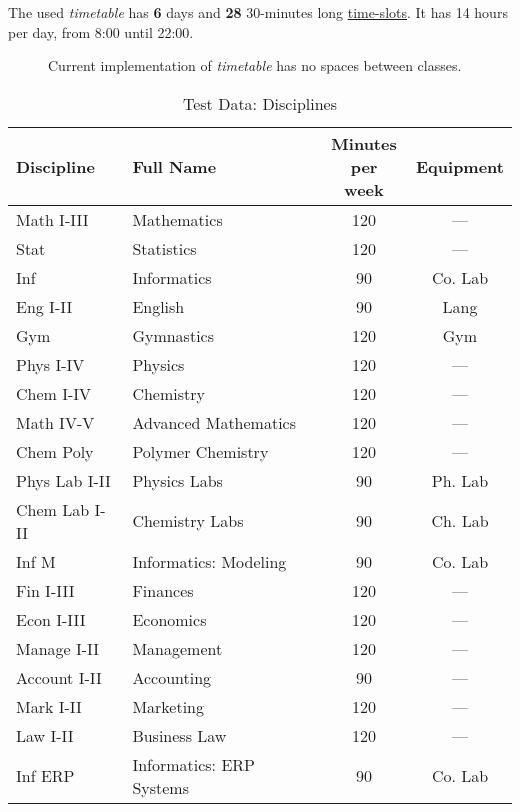 \documentclass[../header]{subfiles}
\begin{document}
The used \emph{timetable} has \textbf{6} days and \textbf{28} 30-minutes long
\underline{time-slots}. It has 14 hours per day, from 8:00 until 22:00.

\begin{figure}[h]
  \centering
  
  \caption[Current timetables implementation]
          {Current implementation of \emph{timetable} has
           no spaces between classes. }
  \label{fig:timetable-current}
\end{figure}




\begin{table}[H]\caption{Test Data: Disciplines}
\label{data:disciplines}
  \centering
  \begin{tabular}{llcc}
    Discipline & Full Name & \shortstack{Minutes\\per week} & Equipment \\\hline\hline
    Math I-III   & Mathematics            & 120 & --- \\
    Stat         & Statistics             & 120 & --- \\
    Inf          & Informatics            & 90  & Co. Lab \\
    Eng I-II     & English                & 90  & Lang \\
    Gym          & Gymnastics             & 120 & Gym \\\hline
    Phys I-IV    & Physics                & 120 & --- \\
    Chem I-IV    & Chemistry              & 120 & --- \\
    Math IV-V    & Advanced Mathematics   & 120 & --- \\
    Chem Poly    & Polymer Chemistry      & 120 & --- \\
    Phys Lab I-II & Physics Labs         & 90  & Ph. Lab \\
    Chem Lab I-II & Chemistry Labs       & 90  & Ch. Lab \\
    Inf M        & Informatics: Modeling  & 90  & Co. Lab \\\hline
    Fin I-III    & Finances               & 120 & --- \\
    Econ I-III   & Economics              & 120 & --- \\
    Manage I-II  & Management             & 120 & --- \\
    Account I-II & Accounting             & 90  & --- \\
    Mark I-II    & Marketing              & 120 & --- \\
    Law I-II     & Business Law           & 120 & --- \\
    Inf ERP      & Informatics: ERP Systems & 90 & Co. Lab \\\hline
  \end{tabular}
\end{table}
\end{document}
